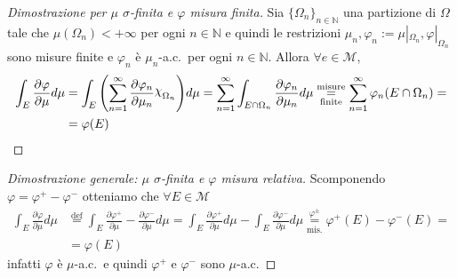 \begin{proof}[Dimostrazione per \(\mu\) \(\sigma\)-finita e \(\varphi \) misura
finita] Sia \({\{\Omega_{n}\}}_{n \in \mathbb{N}}\) una partizione di
    \(\Omega\) tale che \(\mu(\Omega_{n}) < +\infty\) per ogni \(n \in
    \mathbb{N}\) e quindi le restrizioni \(\mu_{n}, \varphi_n :=
    \mu|_{\Omega_{n}}, \varphi|_{\Omega_{n}}  \) sono misure finite e
    \(\varphi_n\) è \(\mu_{n}\)-a.c.~per ogni \(n \in \mathbb{N}\). Allora
    \(\forall e \in \mathcal{M}\),
    \begin{align*}
        \int_E \frac{\partial \varphi }{\partial \mu} d\mu &=
        \int_{E} {\left( \sum_{n=1}^{\infty} \frac{\partial \varphi_n}{\partial
        \mu_{n}}\rchi_{\Omega_{n}}   \right)} d\mu = \sum_{n=1}^{\infty} \int_{E
    \cap \Omega_{n}} \frac{\partial \varphi_n}{\partial \mu_{n}} d\mu
    \underset{\text{finite}}{\overset{\text{misure}}{=}} \sum_{n=1}^{\infty}
    \varphi_n(E \cap \Omega_{n}) = \\ &= \varphi(E)
    \end{align*}

\end{proof}
\begin{proof}[Dimostrazione generale: \(\mu\) \(\sigma\)-finita e \(\varphi\)
    misura relativa] Scomponendo \(\varphi = \varphi^{+} - \varphi^{-}\)
    otteniamo che \(\forall E \in \mathcal{M}\) 
    \begin{align*}
        \int_E \frac{\partial \varphi }{\partial \mu}d\mu
        &\overset{\text{def}}{=} \int_E \frac{\partial \varphi ^{+}}{\partial
        \mu} - \frac{\partial \varphi ^{-}}{\partial \mu} d\mu = \int_E
        \frac{\partial \varphi ^{+}}{\partial \mu} d\mu - \int_E \frac{\partial
            \varphi ^{-}}{\partial \mu} d\mu
            \underset{\text{mis.}}{\overset{\varphi^{\pm}}{=}} \varphi ^{+}(E)
            - \varphi ^{-}(E) =  \\ &=\varphi(E)
    \end{align*}
    infatti \(\varphi\) è \(\mu\)-a.c.~e quindi \(\varphi^{+}\) e
    \(\varphi^{-}\) sono \(\mu\)-a.c.
\end{proof}

